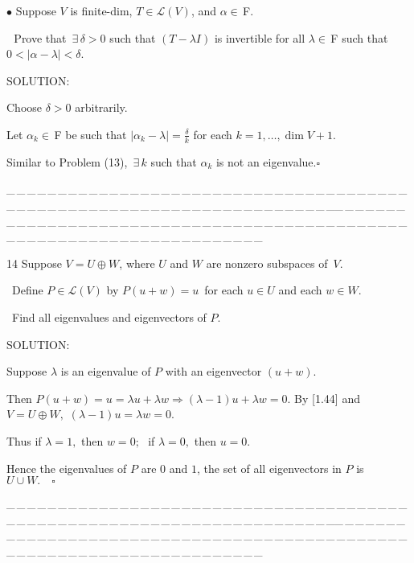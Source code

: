 \documentclass[a4paper, 11pt, UTF8]{article}
\def\Lm{\mathcal{L}}
\def\Fbf{$\,{\timesbf F}\,$}
\def\Fbfc{$\,{\timesbf F}$}
\begin{document}
\begin{large}
{\small $\bullet$} {\timessl\Large 
Suppose $V$ is finite-dim, $T\in\Lm(V)$, and $\alpha\in\Fbfc.$}\par\,\,
{\timessl\Large Prove that $\,\exists\,\delta > 0$ such that $(T-\lambda I)$ is invertible for all $\lambda\in\Fbf\,$such that $0 < |\alpha-\lambda| < \delta$.
}\par
{\timesbf S\footnotesize{OLUTION:}}\par\quad
Choose $\delta>0$ arbitrarily.\par\quad
Let $\alpha_k\in\Fbf\,$be such that $|\alpha_k-\lambda|=\displaystyle\frac{\delta}{k}$ for each $k=1,\dots,\dim V+1.$\par\quad
Similar to Problem (13), $\,\exists\,k$ such that $\alpha_k$ is not an eigenvalue.\quad$\square$\par
{\tiny \_\,\_\,\_\,\_\,\_\,\_\,\_\,\_\,\_\,\_\,\_\,\_\,\_\,\_\,\_\,\_\,\_\,\_\,\_\,\_\,\_\,\_\,\_\,\_\,\_\,\_\,\_\,\_\,\_\,\_\,\_\,\_\,\_\,\_\,\_\,\_\,\_\,\_\,\_\,\_\,\_\,\_\,\_\,\_\,\_\,\_\,\_\,\_\,\_\,\_\,\_\,\_\,\_\,\_\,\_\,\_\,\_\,\_\,\_\,\_\,\_\,\_\,\_\,\_\,\_\,\_\,\_\,\_\,\_\,\_\,\_\_\,\_\,\_\,\_\,\_\,\_\,\_\,\_\,\_\,\_\,\_\,\_\,\_\,\_\,\_\,\_\,\_\,\_\,\_\,\_\,\_\,\_\,\_\,\_\,\_\,\_\,\_\,\_\,\_\,\_\,\_\,\_\,\_\,\_\,\_\,\_\,\_\,\_\,\_\,\_\,\_\,\_\,\_\,\_\,\_\,\_\,\_\,\_\,\_\,\_\,\_\,\_\,\_\,\_\,\_\,\_\,\_\,\_\,\_\,\_\,\_\,\_\,\_\,\_\,\_\,\_\,\_\,\_\,\_\,\_\,\_}\par

{\timesbf\Large 14} {\timessl\Large 
Suppose $V = U\oplus W$, where $U$ and $W$ are nonzero subspaces of \,$V$.}\par\quad\,
{\timessl\Large Define $P\in\Lm(V)$ by $P(u + w) = u$ \,for each $u\in U$ and each $w\in W$.}\par\quad\,
{\timessl\Large
 Find all eigenvalues and eigenvectors of $P$.
}\par
{\timesbf S\footnotesize{OLUTION:}}\par\quad
Suppose $\lambda$ is an eigenvalue of $P$ with an eigenvector $(u+w).$\par\quad
Then $P(u+w)=u=\lambda u+\lambda w\Rightarrow(\lambda-1)u+\lambda w=0.$ By [1.44] and $V=U\oplus W,$ $(\lambda-1)u=\lambda w=0.$\par\quad
Thus if $\lambda=1,$ then $w=0;$\,\, if $\lambda=0,$ then $u=0.$\par\quad
Hence the eigenvalues of $P$ are $0$ and $1$, the set of all eigenvectors in $P$ is $U\cup W.\quad\square$\par
{\tiny \_\,\_\,\_\,\_\,\_\,\_\,\_\,\_\,\_\,\_\,\_\,\_\,\_\,\_\,\_\,\_\,\_\,\_\,\_\,\_\,\_\,\_\,\_\,\_\,\_\,\_\,\_\,\_\,\_\,\_\,\_\,\_\,\_\,\_\,\_\,\_\,\_\,\_\,\_\,\_\,\_\,\_\,\_\,\_\,\_\,\_\,\_\,\_\,\_\,\_\,\_\,\_\,\_\,\_\,\_\,\_\,\_\,\_\,\_\,\_\,\_\,\_\,\_\,\_\,\_\,\_\,\_\,\_\,\_\,\_\,\_\_\,\_\,\_\,\_\,\_\,\_\,\_\,\_\,\_\,\_\,\_\,\_\,\_\,\_\,\_\,\_\,\_\,\_\,\_\,\_\,\_\,\_\,\_\,\_\,\_\,\_\,\_\,\_\,\_\,\_\,\_\,\_\,\_\,\_\,\_\,\_\,\_\,\_\,\_\,\_\,\_\,\_\,\_\,\_\,\_\,\_\,\_\,\_\,\_\,\_\,\_\,\_\,\_\,\_\,\_\,\_\,\_\,\_\,\_\,\_\,\_\,\_\,\_\,\_\,\_\,\_\,\_\,\_\,\_\,\_\,\_}\par


\end{large}
\end{document}
